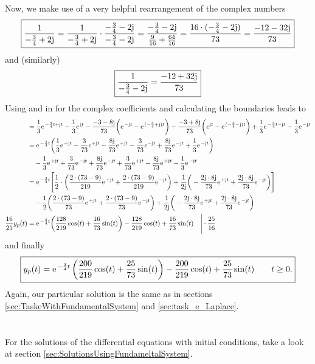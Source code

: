 \documentclass[11pt,a4paper,DIV=12]{scrartcl}
\begin{document}
Now, we make use of a very helpful rearrangement of the complex numbers
\begin{align}
	\label{eq:helpfulCalculation}
	\boxed{\frac{1}{-\frac{3}{4}+2\im}=\frac{1}{-\frac{3}{4}+2\im} \cdot \frac{-\frac{3}{4}-2\im}{-\frac{3}{4}-2\im}=\frac{-\frac{3}{4}-2\im}{\frac{9}{16}+\frac{64}{16}}=\frac{16\cdot (-\frac{3}{4}-2\im)}{73}=\frac{-12-32\im}{73}}
\end{align}
and (similarly)
\begin{align}
	\label{eq:helpfulCalculationAnalog}
	\boxed{\frac{1}{-\frac{3}{4}-2\im}=\frac{-12+32\im}{73}}
\end{align}
Using  and  in  for the complex coefficients and calculating the boundaries leads to
\begin{align}
	&= \frac{1}{3}\e^{-\frac{3}{4}t+\im t}-\frac{1}{3}\e^{\im t}-\frac{-3-8\im}{73}\bigg (\e^{-\im t}-\e^{(-\frac{3}{4}+\im)t}\bigg )-\frac{-3+8\im}{73}\bigg (e^{\im t}-\e^{(-\frac{3}{4}-\im)t}\bigg )+\frac{1}{3}\e^{-\frac{3}{4}t-\im t}-\frac{1}{3}\e^{-\im t} \nonumber \\
	&=\e^{-\frac{3}{4}t}\bigg (\frac{1}{3}\e^{+\im t} -\frac{3}{73}e^{+\im t}-\frac{8\im}{73}\e^{+\im t}-\frac{3}{73}e^{-\im t}+\frac{8\im}{73}\e^{-\im t}+\frac{1}{3}\e^{-\im t}\bigg )\nonumber \\
	&\quad -\frac{1}{3}\e^{+\im t}+\frac{3}{73}\e^{-\im t}+\frac{8\im}{73}\e^{-\im t}+\frac{3}{73}\e^{+\im t}-\frac{8\im}{73}\e^{+\im t}-\frac{1}{3}\e^{-\im t} \nonumber \\
	&=\e^{-\frac{3}{4}t}\Bigg[\frac{1}{2}\cdot\bigg (\frac{2\cdot(73-9)}{219}\e^{+\im t}+\frac{2\cdot(73-9)}{219}\e^{-\im t}\bigg ) + \frac{1}{2\im} \bigg (-\frac{2\im \cdot 8 \im}{73}\e^{+\im t}+\frac{2\im \cdot 8 \im}{73}\e^{-\im t} \bigg ) \Bigg ] \nonumber \\
	&\quad-\frac{1}{2} \bigg (\frac{2\cdot(73-9)}{73}\e^{+\im t}+\frac{2\cdot(73-9)}{73}\e^{-\im t} \bigg ) +\frac{1}{2\im}\bigg (-\frac{2\im\cdot 8 \im}{73}\e^{+\im t}+\frac{2\im\cdot 8 \im}{73}\e^{-\im t}\bigg ) \nonumber \\
	\frac{16}{25}y_p(t)&=\e^{-\frac{3}{4}t}\bigg (\frac{128}{219}\cos (t)+\frac{16}{73}\sin (t)\bigg )-\frac{128}{219}\cos (t)+\frac{16}{73}\sin (t) \quad \Bigg | \cdot \frac{25}{16} \nonumber
\end{align}
and finally
\begin{align}
\boxed{
y_p(t) = \e^{-\frac{3}{4}t}\left(\frac{200}{219}\cos (t)+\frac{25}{73}\sin (t)\right)-\frac{200}{219}\cos (t)+\frac{25}{73}\sin (t)\qquad t\geq 0.
}
\end{align}
Again, our particular solution is the same as in sections \ref{sec:TaskeWithFundamentalSystem} and \ref{sec:task_e_Laplace}.
\\
\\
\\
For the solutions of the differential equations with initial conditions, take a look at section \ref{sec:SolutionsUsingFundameltalSystem}.
\newpage
\end{document}
